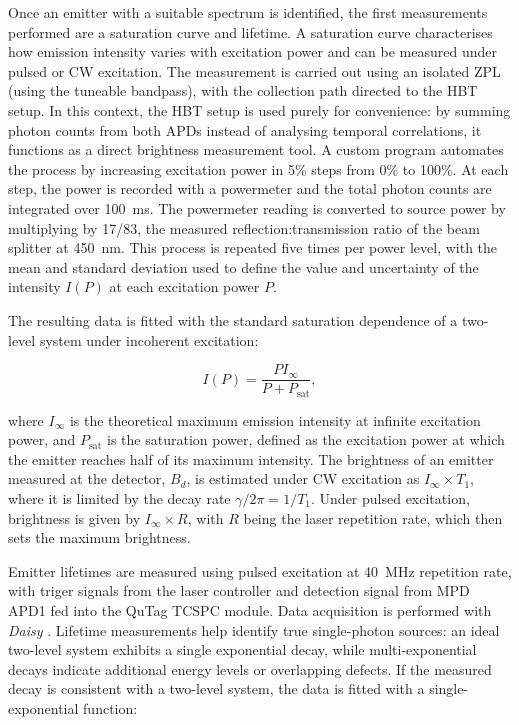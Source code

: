 Once an emitter with a suitable spectrum is identified, the first measurements performed are a saturation curve and lifetime. A saturation curve characterises how emission intensity varies with excitation power and can be measured under pulsed or CW excitation. The measurement is carried out using an isolated ZPL (using the tuneable bandpass), with the collection path directed to the HBT setup. In this context, the HBT setup is used purely for convenience: by summing photon counts from both APDs instead of analysing temporal correlations, it functions as a direct brightness measurement tool. A custom program automates the process by increasing excitation power in 5\% steps from 0\% to 100\%. At each step, the power is recorded with a powermeter and the total photon counts are integrated over 100~ms. The powermeter reading is converted to source power by multiplying by 17/83, the measured reflection:transmission ratio of the beam splitter at 450~nm. This process is repeated five times per power level, with the mean and standard deviation used to define the value and uncertainty of the intensity $I(P)$ at each excitation power $P$.


The resulting data is fitted with the standard saturation dependence of a two-level system under incoherent excitation:

\begin{equation}
    I(P) = \frac{P I_{\infty}}{P + P_{\text{sat}}},
    \label{eqn:p-sat}
\end{equation}

where $I_{\infty}$ is the theoretical maximum emission intensity at infinite excitation power, and $P_{\text{sat}}$ is the saturation power, defined as the excitation power at which the emitter reaches half of its maximum intensity. The brightness of an emitter measured at the detector, $B_d$, is estimated under CW excitation as $I_{\infty}\times T_1$, where it is limited by the decay rate $\gamma/2\pi=1/T_1$. Under pulsed excitation, brightness is given by $I_{\infty}\times R$, with $R$ being the laser repetition rate, which then sets the maximum brightness.

Emitter lifetimes are measured using pulsed excitation at 40~MHz repetition rate, with triger signals from the laser controller and detection signal from MPD APD1 fed into the QuTag TCSPC module. Data acquisition is performed with \textit{Daisy} \cite{zotero-item-9595}. Lifetime measurements help identify true single-photon sources: an ideal two-level system exhibits a single exponential decay, while multi-exponential decays indicate additional energy levels or overlapping defects. If the measured decay is consistent with a two-level system, the data is fitted with a single-exponential function:

